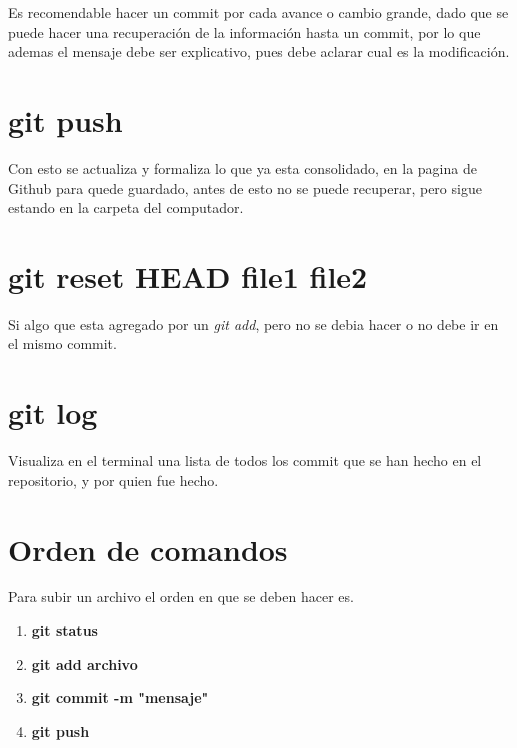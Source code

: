 \documentclass[letter,10pt]{article}
\newcommand{\g}{Github }
\begin{document}
Es recomendable hacer un commit por cada avance o cambio grande, dado que se puede hacer una recuperación de la información hasta un commit, por lo que ademas el mensaje debe ser explicativo, pues debe aclarar cual es la modificación.

\section{git push}

Con esto se actualiza y formaliza lo que ya esta consolidado, en la pagina de \g para quede guardado, antes de esto no se puede recuperar, pero sigue estando en la carpeta del computador. 

\section{git reset HEAD file1 file2}

Si algo que esta agregado por un \textit{git add}, pero no se debia hacer o no debe ir en el mismo commit.

\section{git log}

Visualiza en el terminal una lista de todos los commit que se han hecho en el repositorio, y por quien fue hecho.

\section{Orden de comandos}
Para subir un archivo el orden en que se deben hacer es. 

\begin{enumerate}
\item \textbf{git status}
\item \textbf{git add archivo}
\item \textbf{git commit -m "mensaje"}
\item \textbf{git push}

\end{enumerate}
 
 
\end{document}
